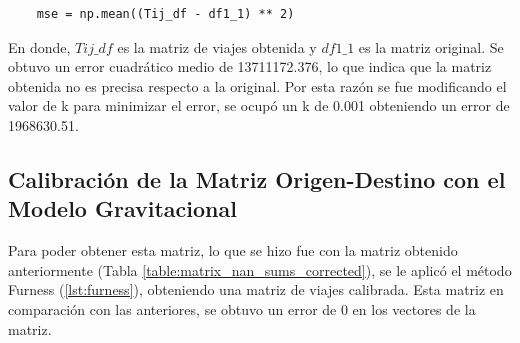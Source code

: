 \documentclass[letterpaper,12pt]{article}
\begin{document}
\begin{lstlisting}
    mse = np.mean((Tij_df - df1_1) ** 2)
\end{lstlisting}

En donde, $Tij\_df$ es la matriz de viajes obtenida y $df1\_1$ es la matriz original. Se obtuvo un error cuadrático medio de 13711172.376, lo que indica que la matriz obtenida no es precisa respecto a la original. Por esta razón se fue modificando el valor de k para minimizar el error, se ocupó un k de 0.001 obteniendo un error de 1968630.51. 

\subsection{Calibración de la Matriz Origen-Destino con el Modelo Gravitacional}

Para poder obtener esta matriz, lo que se hizo fue con la matriz obtenido anteriormente (Tabla \ref{table:matrix_nan_sums_corrected}), se le aplicó el método Furness (\ref{lst:furness}), obteniendo una matriz de viajes calibrada. Esta matriz en comparación con las anteriores, se obtuvo un error de 0 en los vectores de la matriz.
\end{document}
